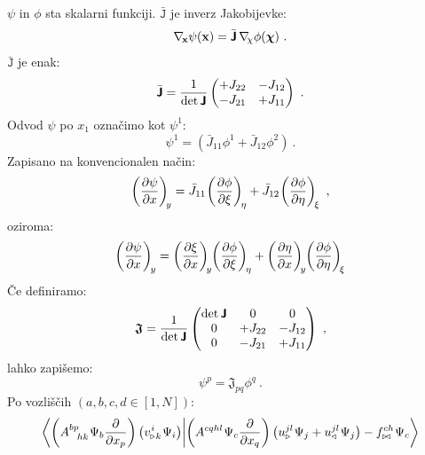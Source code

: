 $\psi$ in $\phi$ sta skalarni funkciji. $\bar{\texttt{J}}$ je inverz Jakobijevke:
\begin{equation}
   \mathbf{\nabla_{\mkern-3mu x}} \psi(\mathbf{x}) = \bar{\bm{\mathsf{J}}} \mkern3mu \mathbf{\nabla_{\mkern-4mu \chi}} \phi(\bm{\chi}) \ .
\end{equation}
$\bar{\texttt{J}}$ je enak:
\begin{equation}
   \bar{\bm{\mathsf{J}}}
   =
   \frac{1}{\det \bm{\mathsf{J}}}
   \begin{pmatrix}
      +J_{22} & -J_{12} \\
      -J_{21} & +J_{11}
   \end{pmatrix}
   \ .
\end{equation}
Odvod $\psi$ po $x_1$ označimo kot $\psi^1$:
\begin{equation}
   \psi^1 = \left(\bar{J}_{11} \phi^1 + \bar{J}_{12} \phi^2 \right) \ .
\end{equation}
Zapisano na konvencionalen način:
\begin{equation}
   \left(\frac{\partial \psi}{\partial x}\right)_{\mkern-4mu y}
   =
   \bar{J}_{11} \mkern-2mu \left(\frac{\partial \phi}{\partial \xi}\right)_{\mkern-3mu \eta}
   +
   \bar{J}_{12} \mkern-2mu \left(\frac{\partial \phi}{\partial \eta}\right)_{\mkern-3mu \xi} \ ,
\end{equation}
oziroma:
\begin{equation}
   \left(\frac{\partial \psi}{\partial x} \right)_{\mkern-3mu y}
   =
   \left(\frac{\partial \xi}{\partial x} \right)_{\mkern-4mu y}
   \mkern-4mu \left(\frac{\partial \phi}{\partial \xi}\right)_{\mkern-3mu \eta}
   +
   \left(\frac{\partial \eta}{\partial x}\right)_{\mkern-4mu y}
   \mkern-4mu \left(\frac{\partial \phi}{\partial \eta}\right)_{\mkern-3mu \xi}
\end{equation}
Če definiramo:
\begin{equation}
   \bm{\mathsf{\mathfrak{J}}}
   =
   \frac{1}{\det \bm{\mathsf{J}}}
   \begin{pmatrix}
      \det \bm{\mathsf{J}} & 0       & 0       \\
      0                & +J_{22} & -J_{12} \\
      0                & -J_{21} & +J_{11}
   \end{pmatrix} \ ,
\end{equation}
lahko zapišemo:
\begin{equation}
   \psi^p = \mathfrak{J}_{pq} \phi^{q} \ .
   \label{eq:refToEmt}
\end{equation}
Po vozliščih $(a, b, c, d \in [1,N])$:
\begin{equation}
   \braket{
      \left(A^{b p}_{\mkern14mu hk} \mkern1mu \Psi_b \frac{\partial}{\partial x_p}\right)
      \left(v^{\mkern1mu i}_{\triangleright \mkern1mu k} \mkern1mu \Psi_i \right)}
   {
      \left(A^{c q h l} \mkern1mu \Psi_c \frac{\partial}{\partial x_q}\right)
      \left(u^{j l}_\triangleright \mkern1mu \Psi_j + u^{j l}_\triangleleft \mkern1mu \Psi_j \right)
      -
      f^{c h}_{\bowtie} \mkern1mu \Psi_c }
\end{equation}
